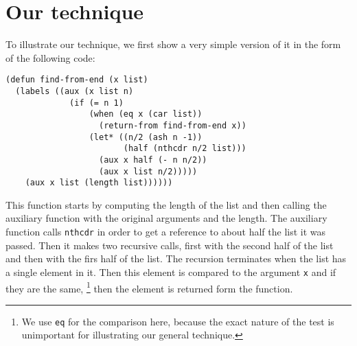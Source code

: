 \section{Our technique}

To illustrate our technique, we first show a very simple version of it
in the form of the following code:

{\small\begin{verbatim}
(defun find-from-end (x list)
  (labels ((aux (x list n)
             (if (= n 1)
                 (when (eq x (car list))
                   (return-from find-from-end x))
                 (let* ((n/2 (ash n -1))
                        (half (nthcdr n/2 list)))
                   (aux x half (- n n/2))
                   (aux x list n/2)))))
    (aux x list (length list))))))
\end{verbatim}}

This function starts by computing the length of the list and then
calling the auxiliary function with the original arguments and the
length.  The auxiliary function calls \texttt{nthcdr} in order to get
a reference to about half the list it was passed.  Then it makes two
recursive calls, first with the second half of the list and then with
the firs half of the list.  The recursion terminates when the list has
a single element in it.  Then this element is compared to the argument
\texttt{x} and if they are the same,%
\footnote{We use \texttt{eq} for the comparison here, because the
  exact nature of the test is unimportant for illustrating our general
  technique.}
then the element is returned form the function.
